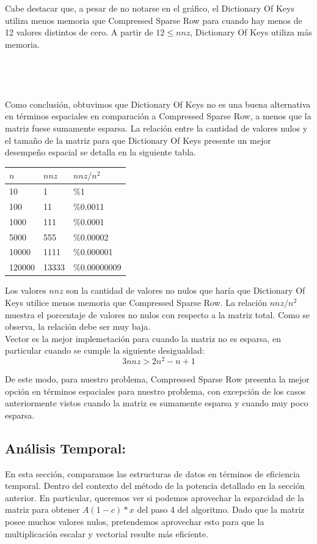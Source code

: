Cabe destacar que, a pesar de no notarse en el gráfico, el Dictionary Of Keys utiliza menos memoria que Compressed Sparse Row para cuando hay menos de 12 valores distintos de cero. A partir de $12 \leq nnz$, Dictionary Of Keys utiliza más memoria. \\ \\ \\ \\  \\
Como conclusión, obtuvimos que Dictionary Of Keys no es una buena alternativa en términos espaciales en comparación a Compressed Sparse Row,  a menos que la matriz fuese sumamente esparsa. La relación entre la cantidad de valores nulos y el tamaño de la matriz para que Dictionary Of Keys presente un mejor desempeño espacial  se detalla en la siguiente tabla.

\begin{center}
    \begin{tabular}{| l | l | l |}
    \hline
    $n$ & $nnz$ & $nnz/n^2$  \\ \hline
    10	& 1	& \%1 \\ \hline
	100	& 11	& \%0.0011 \\ \hline
	1000 & 111	& \%0.0001 \\ \hline
	5000 & 555 & \%0.00002 \\ \hline
	10000 & 1111 & \%0.000001 \\ \hline
	120000 & 13333 & \%0.00000009 \\ \hline
    \end{tabular}
\end{center}

Los valores $nnz$ son la cantidad de valores no nulos que haría que Dictionary Of Keys utilice menos memoria que Compressed Sparse Row. La relación $nnz/n^2$ muestra el porcentaje de valores no nulos con respecto a la matriz total. Como se observa, la relación debe ser muy baja.\\

Vector es la mejor implemetación para cuando la matriz no es esparsa, en particular cuando se cumple la siguiente desigualdad: $$3 nnz > 2n^2 - n + 1$$

De este modo, para nuestro problema, Compressed Sparse Row presenta la mejor opción en términos espaciales para nuestro problema, con excepción de los casos anteriormente vistos cuando la matriz es sumamente esparsa y cuando muy poco esparsa.

\subsection{Análisis Temporal:}
En esta sección, comparamos las estructuras de datos en términos de eficiencia temporal. 
Dentro del contexto del método de la potencia detallado en la sección anterior. En particular, queremos ver si podemos aprovechar la esparcidad de la matriz para obtener  $A (1-c)*x $ del paso 4 del algoritmo. Dado que la matriz posee muchos valores nulos, pretendemos aprovechar esto para que la multiplicación escalar y vectorial resulte más eficiente.\\

